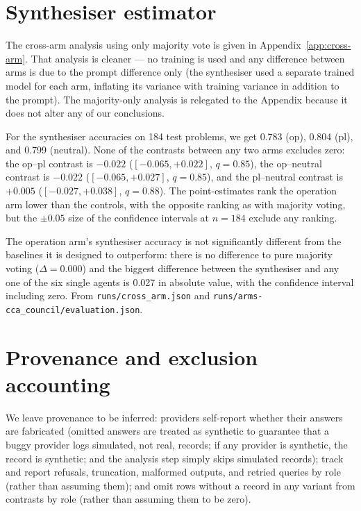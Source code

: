 \section{Synthesiser estimator}
\label{app:synth}

The cross-arm analysis using only majority vote is given in Appendix~\ref{app:cross-arm}. That
analysis is cleaner --- no training is used and any difference between arms is due to the prompt
difference only (the synthesiser used a separate trained model for each arm, inflating its variance
with training variance in addition to the prompt). The majority-only analysis is relegated to the
Appendix because it does not alter any of our conclusions.

For the synthesiser accuracies on 184 test problems, we get 0.783 (op), 0.804 (pl), and 0.799
(neutral). None of the contrasts between any two arms excludes zero: the op--pl contrast is $-0.022$
($[-0.065, +0.022]$, $q = 0.85$), the op--neutral contrast is $-0.022$ ($[-0.065, +0.027]$,
$q = 0.85$), and the pl--neutral contrast is $+0.005$ ($[-0.027, +0.038]$, $q = 0.88$). The
point-estimates rank the operation arm lower than the controls, with the opposite ranking as with
majority voting, but the $\pm 0.05$ size of the confidence intervals at $n = 184$ exclude any
ranking.

The operation arm's synthesiser accuracy is not significantly different from the baselines it is
designed to outperform: there is no difference to pure majority voting ($\Delta = 0.000$) and the
biggest difference between the synthesiser and any one of the six single agents is 0.027 in absolute
value, with the confidence interval including zero. From \texttt{runs/cross\_arm.json} and
\texttt{runs/arms-cca\_council/evaluation.json}.

\section{Provenance and exclusion accounting}
\label{app:provenance}

We leave provenance to be inferred: providers self-report whether their answers are fabricated
(omitted answers are treated as synthetic to guarantee that a buggy provider logs simulated, not
real, records; if any provider is synthetic, the record is synthetic; and the analysis step simply
skips simulated records); track and report refusals, truncation, malformed outputs, and retried
queries by role (rather than assuming them); and omit rows without a record in any variant from
contrasts by role (rather than assuming them to be zero).

